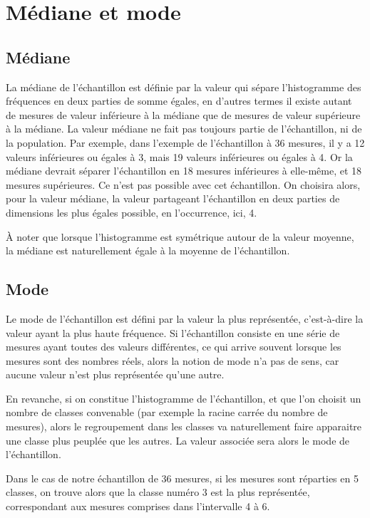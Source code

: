 \section{Médiane et mode}

\subsection{Médiane}

La médiane de l'échantillon est définie par la valeur qui sépare l'histogramme des fréquences en deux parties de somme égales, en d'autres termes il existe autant de mesures de valeur inférieure à la médiane que de mesures de valeur supérieure à la médiane. La valeur médiane ne fait pas toujours partie de l'échantillon, ni de la population. Par exemple, dans l'exemple de l'échantillon à 36 mesures, il y a 12 valeurs inférieures ou égales à 3, mais 19 valeurs inférieures ou égales à 4. Or la médiane devrait séparer l'échantillon en 18 mesures inférieures à elle-même, et 18 mesures supérieures. Ce n'est pas possible avec cet échantillon. On choisira alors, pour la valeur médiane, la valeur partageant l'échantillon en deux parties de dimensions les plus égales possible, en l'occurrence, ici, 4.

À noter que lorsque l'histogramme est symétrique autour de la valeur moyenne, la médiane est naturellement égale à la moyenne de l'échantillon.

\subsection{Mode}

Le mode de l'échantillon est défini par la valeur la plus représentée, c'est-à-dire la valeur ayant la plus haute fréquence. Si l'échantillon consiste en une série de mesures ayant toutes des valeurs différentes, ce qui arrive souvent lorsque les mesures sont des nombres réels, alors la notion de mode n'a pas de sens, car aucune valeur n'est plus représentée qu'une autre.

En revanche, si on constitue l'histogramme de l'échantillon, et que l'on choisit un nombre de classes convenable (par exemple la racine carrée du nombre de mesures), alors le regroupement dans les classes va naturellement faire apparaitre une classe plus peuplée que les autres. La valeur associée sera alors le mode de l'échantillon.

Dans le cas de notre échantillon de 36 mesures, si les mesures sont réparties en 5 classes, on trouve alors que la classe numéro 3 est la plus représentée, correspondant aux mesures comprises dans l'intervalle 4 à 6.

